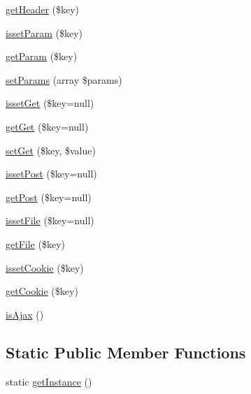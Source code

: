 \begin{DoxyCompactItemize}
\item 
\hyperlink{class_anemo_1_1_application_1_1_http_1_1_request_aa1f2a2f92a2561c725c77e9aef934553}{getHeader} (\$key)
\item 
\hyperlink{class_anemo_1_1_application_1_1_http_1_1_request_af1a95a5664428a781019e5ef56006507}{issetParam} (\$key)
\item 
\hyperlink{class_anemo_1_1_application_1_1_http_1_1_request_ac30e143829b81d81c9fa0f6d6c8542fe}{getParam} (\$key)
\item 
\hyperlink{class_anemo_1_1_application_1_1_http_1_1_request_a490ec24c6b656e391669feb5ddcd6620}{setParams} (array \$params)
\item 
\hyperlink{class_anemo_1_1_application_1_1_http_1_1_request_a4b9574bc2b8f462ec1f216b8cdcbe2cf}{issetGet} (\$key=null)
\item 
\hyperlink{class_anemo_1_1_application_1_1_http_1_1_request_aee3cdce4b34819cc145af3aa09cbb02d}{getGet} (\$key=null)
\item 
\hyperlink{class_anemo_1_1_application_1_1_http_1_1_request_a6d711e62d8ca2300d631636fa6177b76}{setGet} (\$key, \$value)
\item 
\hyperlink{class_anemo_1_1_application_1_1_http_1_1_request_a46092d77787f6220fa8ed94c41780f20}{issetPost} (\$key=null)
\item 
\hyperlink{class_anemo_1_1_application_1_1_http_1_1_request_abfecde60c98a1f805b56387933b6f6c2}{getPost} (\$key=null)
\item 
\hyperlink{class_anemo_1_1_application_1_1_http_1_1_request_aed44502c1b16fa2e422a1380d2f53a2e}{issetFile} (\$key=null)
\item 
\hyperlink{class_anemo_1_1_application_1_1_http_1_1_request_a6c6e689f88ad22aa3de05f417e26bc6f}{getFile} (\$key)
\item 
\hyperlink{class_anemo_1_1_application_1_1_http_1_1_request_a1e1772d143ce952d1ad3931942b676ba}{issetCookie} (\$key)
\item 
\hyperlink{class_anemo_1_1_application_1_1_http_1_1_request_a5397dad675daf81256839b7fb70b8234}{getCookie} (\$key)
\item 
\hyperlink{class_anemo_1_1_application_1_1_http_1_1_request_aac147108d427123081cc91d8d9f32c8f}{isAjax} ()
\end{DoxyCompactItemize}
\subsection*{Static Public Member Functions}
\begin{DoxyCompactItemize}
\item 
static \hyperlink{class_anemo_1_1_application_1_1_http_1_1_request_ac93fbec81f07e5d15f80db907e63dc10}{getInstance} ()
\end{DoxyCompactItemize}
